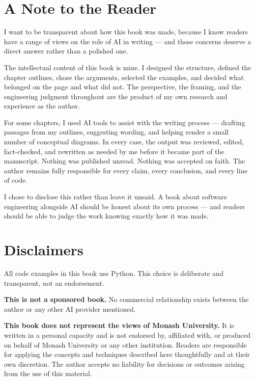 \documentclass[11pt,a4paper]{book}
\begin{document}
\section{A Note to the Reader}

I want to be transparent about how this book was made, because I know readers have a range of views on the role of AI in writing --- and those concerns deserve a direct answer rather than a polished one.

The intellectual content of this book is mine. I designed the structure, defined the chapter outlines, chose the arguments, selected the examples, and decided what belonged on the page and what did not. The perspective, the framing, and the engineering judgment throughout are the product of my own research and experience as the author.

For some chapters, I used AI tools to assist with the writing process --- drafting passages from my outlines, suggesting wording, and helping render a small number of conceptual diagrams. In every case, the output was reviewed, edited, fact-checked, and rewritten as needed by me before it became part of the manuscript. Nothing was published unread. Nothing was accepted on faith. The author remains fully responsible for every claim, every conclusion, and every line of code.

I chose to disclose this rather than leave it unsaid. A book about software engineering alongside AI should be honest about its own process --- and readers should be able to judge the work knowing exactly how it was made.

\section{Disclaimers}

All code examples in this book use Python. This choice is deliberate and transparent, not an endorsement.

\textbf{This is not a sponsored book.} No commercial relationship exists between the author or any other AI provider mentioned.

\textbf{This book does not represent the views of Monash University.} It is written in a personal capacity and is not endorsed by, affiliated with, or produced on behalf of Monash University or any other institution. Readers are responsible for applying the concepts and techniques described here thoughtfully and at their own discretion. The author accepts no liability for decisions or outcomes arising from the use of this material.
\end{document}
